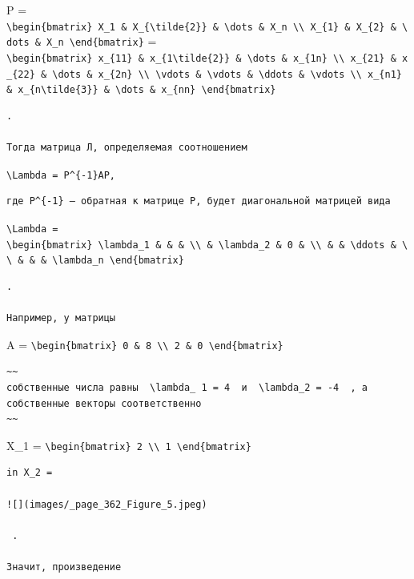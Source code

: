 \documentclass[
  ukrainian,
]{article}
\begin{document}
P =
\texttt{\textbackslash{}begin\{bmatrix\}\ X\_1\ \&\ X\_\{\textbackslash{}tilde\{2\}\}\ \&\ \textbackslash{}dots\ \&\ X\_n\ \textbackslash{}\textbackslash{}\ X\_\{1\}\ \&\ X\_\{2\}\ \&\ \textbackslash{}dots\ \&\ X\_n\ \textbackslash{}end\{bmatrix\}}
=
\texttt{\textbackslash{}begin\{bmatrix\}\ x\_\{11\}\ \&\ x\_\{1\textbackslash{}tilde\{2\}\}\ \&\ \textbackslash{}dots\ \&\ x\_\{1n\}\ \textbackslash{}\textbackslash{}\ x\_\{21\}\ \&\ x\_\{22\}\ \&\ \textbackslash{}dots\ \&\ x\_\{2n\}\ \textbackslash{}\textbackslash{}\ \textbackslash{}vdots\ \&\ \textbackslash{}vdots\ \&\ \textbackslash{}ddots\ \&\ \textbackslash{}vdots\ \textbackslash{}\textbackslash{}\ x\_\{n1\}\ \&\ x\_\{n\textbackslash{}tilde\{3\}\}\ \&\ \textbackslash{}dots\ \&\ x\_\{nn\}\ \textbackslash{}end\{bmatrix\}}

\begin{verbatim}
.

Тогда матрица Л, определяемая соотношением
\end{verbatim}

\texttt{\textbackslash{}Lambda\ =\ P\^{}\{-1\}AP,}

\begin{verbatim}
где P^{-1} — обратная к матрице P, будет диагональной матрицей вида
\end{verbatim}

\texttt{\textbackslash{}Lambda\ =}
\texttt{\textbackslash{}begin\{bmatrix\}\ \textbackslash{}lambda\_1\ \&\ \&\ \&\ \textbackslash{}\textbackslash{}\ \&\ \textbackslash{}lambda\_2\ \&\ 0\ \&\ \textbackslash{}\textbackslash{}\ \&\ \&\ \textbackslash{}ddots\ \&\ \textbackslash{}\textbackslash{}\ \&\ \&\ \&\ \textbackslash{}lambda\_n\ \textbackslash{}end\{bmatrix\}}

\begin{verbatim}
.

Например, у матрицы
\end{verbatim}

A =
\texttt{\textbackslash{}begin\{bmatrix\}\ 0\ \&\ 8\ \textbackslash{}\textbackslash{}\ 2\ \&\ 0\ \textbackslash{}end\{bmatrix\}}

\begin{verbatim}
~~
собственные числа равны  \lambda_ 1 = 4  и  \lambda_2 = -4  , а собственные векторы соответственно
~~
\end{verbatim}

X\_1 =
\texttt{\textbackslash{}begin\{bmatrix\}\ 2\ \textbackslash{}\textbackslash{}\ 1\ \textbackslash{}end\{bmatrix\}}

\begin{verbatim}
in X_2 =

![](images/_page_362_Figure_5.jpeg)

 .

Значит, произведение
\end{verbatim}
\end{document}
